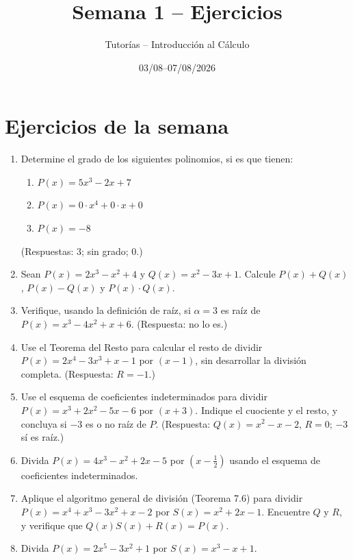 \documentclass[11pt]{article}
\title{Semana 1 -- Ejercicios}
\author{Tutorías -- Introducción al Cálculo}
\date{03/08--07/08/2026}
\begin{document}
\maketitle

\section{Ejercicios de la semana}

\begin{enumerate}[label=\arabic*.]

\item Determine el grado de los siguientes polinomios, si es que tienen:
\begin{enumerate}[label=(\alph*)]
\item $P(x) = 5x^3 - 2x + 7$
\item $P(x) = 0 \cdot x^4 + 0 \cdot x + 0$
\item $P(x) = -8$
\end{enumerate}
(Respuestas: 3; sin grado; 0.)

\item Sean $P(x) = 2x^3 - x^2 + 4$ y $Q(x) = x^2 - 3x + 1$. Calcule $P(x)+Q(x)$,
$P(x)-Q(x)$ y $P(x)\cdot Q(x)$.

\item Verifique, usando la definición de raíz, si $\alpha = 3$ es raíz de
$P(x) = x^3 - 4x^2 + x + 6$. (Respuesta: no lo es.)

\item Use el Teorema del Resto para calcular el resto de dividir
$P(x) = 2x^4 - 3x^3 + x - 1$ por $(x-1)$, sin desarrollar la división
completa. (Respuesta: $R=-1$.)

\item Use el esquema de coeficientes indeterminados para dividir
$P(x) = x^3 + 2x^2 - 5x - 6$ por $(x+3)$. Indique el cuociente y el resto, y
concluya si $-3$ es o no raíz de $P$. (Respuesta: $Q(x)=x^2-x-2$, $R=0$;
$-3$ sí es raíz.)

\item Divida $P(x) = 4x^3 - x^2 + 2x - 5$ por $(x-\tfrac12)$ usando el
esquema de coeficientes indeterminados.

\item Aplique el algoritmo general de división (Teorema 7.6) para dividir
$P(x) = x^4 + x^3 - 3x^2 + x - 2$ por $S(x) = x^2 + 2x - 1$. Encuentre $Q$ y
$R$, y verifique que $Q(x)S(x)+R(x) = P(x)$.

\item Divida $P(x) = 2x^5 - 3x^2 + 1$ por $S(x) = x^3 - x + 1$.


\end{enumerate}
\end{document}

